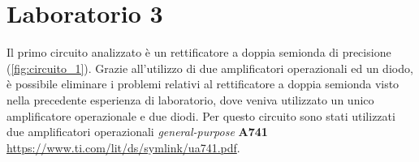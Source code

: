 \chapter{Laboratorio 3}

Il primo circuito analizzato è un rettificatore a doppia semionda di precisione (\Fig\ref{fig:circuito_1}). Grazie all'utilizzo di due amplificatori operazionali ed un diodo, è possibile eliminare i problemi relativi al rettificatore a doppia semionda visto nella precedente esperienza di laboratorio, dove veniva utilizzato un unico amplificatore operazionale e due diodi. Per questo circuito sono stati utilizzati due amplificatori operazionali \textit{general-purpose} \textbf{\textmu A741} \url{https://www.ti.com/lit/ds/symlink/ua741.pdf}.


